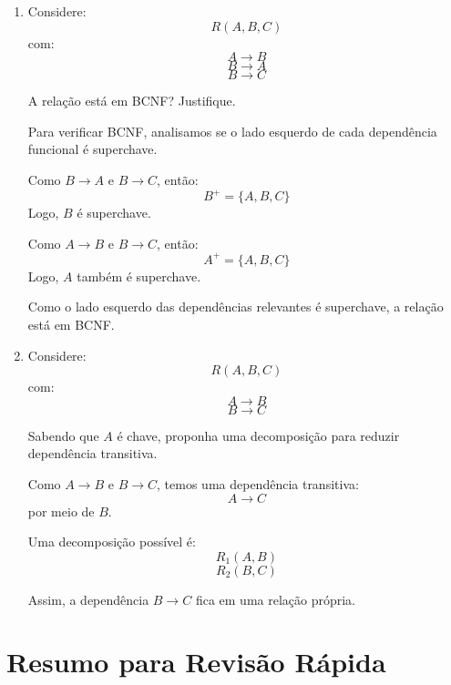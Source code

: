 \documentclass[12pt,a4paper]{article}
\begin{document}
\begin{enumerate}[resume,label=\textbf{Q\arabic*.}]
Calcule $(AB)^+$.

\begin{resposta}
Começamos com:
\[
(AB)^+ = \{A, B\}
\]

Como $AB \rightarrow C$:
\[
(AB)^+ = \{A, B, C\}
\]

Como $C \rightarrow D$:
\[
(AB)^+ = \{A, B, C, D\}
\]

Logo:
\[
(AB)^+ = \{A, B, C, D\}
\]

Portanto, $AB$ é chave para $R$.
\end{resposta}

\item Considere:
\[
R(A, B, C)
\]
com:
\[
A \rightarrow B
\]
\[
B \rightarrow A
\]
\[
B \rightarrow C
\]

A relação está em BCNF? Justifique.

\begin{resposta}
Para verificar BCNF, analisamos se o lado esquerdo de cada dependência funcional é superchave.

Como $B \rightarrow A$ e $B \rightarrow C$, então:
\[
B^+ = \{A, B, C\}
\]
Logo, $B$ é superchave.

Como $A \rightarrow B$ e $B \rightarrow C$, então:
\[
A^+ = \{A, B, C\}
\]
Logo, $A$ também é superchave.

Como o lado esquerdo das dependências relevantes é superchave, a relação está em BCNF.
\end{resposta}

\item Considere:
\[
R(A, B, C)
\]
com:
\[
A \rightarrow B
\]
\[
B \rightarrow C
\]

Sabendo que $A$ é chave, proponha uma decomposição para reduzir dependência transitiva.

\begin{resposta}
Como $A \rightarrow B$ e $B \rightarrow C$, temos uma dependência transitiva:
\[
A \rightarrow C
\]
por meio de $B$.

Uma decomposição possível é:
\[
R_1(A, B)
\]
\[
R_2(B, C)
\]

Assim, a dependência $B \rightarrow C$ fica em uma relação própria.
\end{resposta}

\end{enumerate}

\section*{Resumo para Revisão Rápida}
\end{document}
